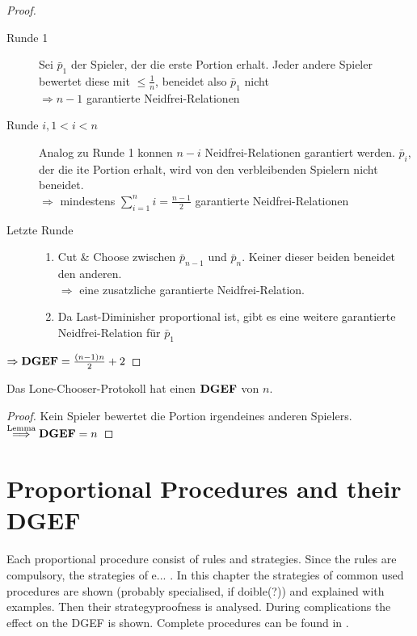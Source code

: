 \begin{proof}
 \begin{description}
  \item[Runde 1] Sei $\bar{p}_1$ der Spieler, der die erste Portion erhalt. Jeder andere Spieler bewertet diese mit $\leq\frac{1}{n}$,
                 beneidet also $\bar{p}_1$ nicht\\$\Rightarrow n-1$ garantierte Neidfrei-Relationen
  \item[Runde $i, 1<i<n$] Analog zu Runde 1 konnen $n-i$ Neidfrei-Relationen garantiert werden. $\bar{p}_i$, der die ite Portion erhalt, wird
                          von den verbleibenden Spielern nicht beneidet.\\$\Rightarrow$ mindestens $\sum\limits_{i=1}^ni=\frac{n-1}{2}$
                          garantierte Neidfrei-Relationen
  \item[Letzte Runde] \begin{enumerate}
                       \item Cut \& Choose zwischen $\bar{p}_{n-1}$ und $\bar{p}_n$. Keiner dieser beiden beneidet den anderen.\\
                             $\Rightarrow$ eine zusatzliche garantierte Neidfrei-Relation.
                       \item Da Last-Diminisher proportional ist, gibt es eine weitere garantierte Neidfrei-Relation für $\bar{p}_1$
                      \end{enumerate}
 \end{description}
$\Rightarrow\text{\textbf{DGEF}}=\frac{(n-1)n}{2}+2$ 
\end{proof}
\begin{satz}
 Das Lone-Chooser-Protokoll hat einen $\text{\textbf{DGEF}}$ von $n$.
\end{satz}
\begin{proof}
 Kein Spieler bewertet die Portion irgendeines anderen Spielers.\\$\stackrel{\text{Lemma}}{\Longrightarrow}\text{\textbf{DGEF}}=n$
\end{proof}


\pagebreak

\section{Proportional Procedures and their DGEF}
Each proportional procedure consist of rules and strategies. Since the rules are compulsory, the strategies of e... . In this chapter the strategies of common used procedures are shown (probably specialised, if doible(?)) and explained with examples. Then their strategyproofness is analysed. During complications the effect on the DGEF is shown. Complete procedures can be found in \cite{}.
